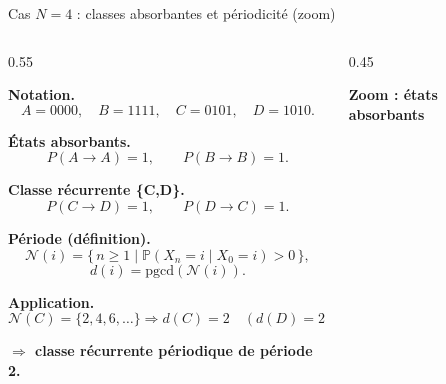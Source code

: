 \documentclass{beamer}
\begin{document}
\begin{frame}{Cas $N=4$ : classes absorbantes et périodicité (zoom)}

\small

\setlength{\abovedisplayskip}{5pt}
\setlength{\belowdisplayskip}{5pt}

\begin{columns}

\begin{column}{0.55\textwidth}

\textbf{Notation.}
\[
A=0000,\quad B=1111,\quad C=0101,\quad D=1010.
\]

\vspace{0.05cm}

\textbf{États absorbants.}
\[
P(A\to A)=1,\qquad P(B\to B)=1.
\]

\vspace{0.05cm}

\textbf{Classe récurrente \{C,D\}.}
\[
P(C\to D)=1,\qquad P(D\to C)=1.
\]

\vspace{0.05cm}

\textbf{Période (définition).}
\[
\mathcal{N}(i)=\{\,n\ge1 \mid \mathbb{P}(X_n=i \mid X_0=i)>0\,\},
\]
\[
d(i)=\mathrm{pgcd}(\mathcal{N}(i)).
\]

\vspace{0.05cm}

\textbf{Application.}
\[
\mathcal{N}(C)=\{2,4,6,\dots\}
\Rightarrow
d(C)=2 \quad(d(D)=2).
\]

\textbf{$\Rightarrow$ classe récurrente périodique de période 2.}

\end{column}

\begin{column}{0.45\textwidth}
\centering

\vspace{-0.2cm} %

\textbf{Zoom : états absorbants}

\vspace{0.08cm}


\end{column}
\end{columns}
\end{frame}
\end{document}
